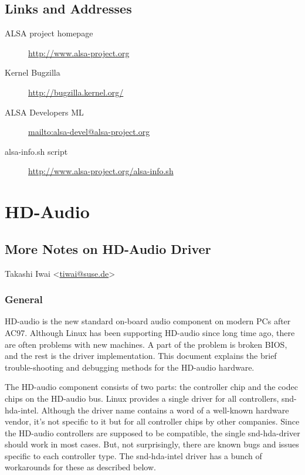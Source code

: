 \documentclass[a4paper,8pt,english]{sphinxmanual}
\begin{document}
\section{Links and Addresses}
\label{sound/alsa-configuration:links-and-addresses}\begin{description}
\item[{ALSA project homepage}] \leavevmode
\href{http://www.alsa-project.org}{http://www.alsa-project.org}

\item[{Kernel Bugzilla}] \leavevmode
\href{http://bugzilla.kernel.org/}{http://bugzilla.kernel.org/}

\item[{ALSA Developers ML}] \leavevmode
\href{mailto:alsa-devel@alsa-project.org}{mailto:alsa-devel@alsa-project.org}

\item[{alsa-info.sh script}] \leavevmode
\href{http://www.alsa-project.org/alsa-info.sh}{http://www.alsa-project.org/alsa-info.sh}

\end{description}


\chapter{HD-Audio}
\label{sound/hd-audio/index::doc}\label{sound/hd-audio/index:hd-audio}

\section{More Notes on HD-Audio Driver}
\label{sound/hd-audio/notes::doc}\label{sound/hd-audio/notes:more-notes-on-hd-audio-driver}
Takashi Iwai \textless{}\href{mailto:tiwai@suse.de}{tiwai@suse.de}\textgreater{}


\subsection{General}
\label{sound/hd-audio/notes:general}
HD-audio is the new standard on-board audio component on modern PCs
after AC97.  Although Linux has been supporting HD-audio since long
time ago, there are often problems with new machines.  A part of the
problem is broken BIOS, and the rest is the driver implementation.
This document explains the brief trouble-shooting and debugging
methods for the HD-audio hardware.

The HD-audio component consists of two parts: the controller chip and
the codec chips on the HD-audio bus.  Linux provides a single driver
for all controllers, snd-hda-intel.  Although the driver name contains
a word of a well-known hardware vendor, it's not specific to it but for
all controller chips by other companies.  Since the HD-audio
controllers are supposed to be compatible, the single snd-hda-driver
should work in most cases.  But, not surprisingly, there are known
bugs and issues specific to each controller type.  The snd-hda-intel
driver has a bunch of workarounds for these as described below.
\end{document}
